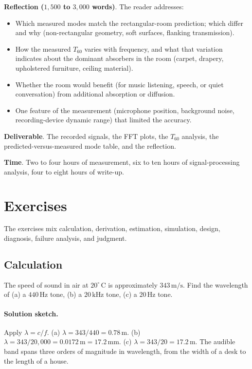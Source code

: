 \begin{project}
\textbf{Reflection ($1{,}500$ to $3{,}000$ words)}. The reader
addresses:

\begin{itemize}[leftmargin=*]
  \item Which measured modes match the rectangular-room prediction;
    which differ and why (non-rectangular geometry, soft surfaces,
    flanking transmission).
  \item How the measured $T_{60}$ varies with frequency, and what
    that variation indicates about the dominant absorbers in the
    room (carpet, drapery, upholstered furniture, ceiling material).
  \item Whether the room would benefit (for music listening,
    speech, or quiet conversation) from additional absorption or
    diffusion.
  \item One feature of the measurement (microphone position,
    background noise, recording-device dynamic range) that limited
    the accuracy.
\end{itemize}

\textbf{Deliverable}. The recorded signals, the FFT plots, the
$T_{60}$ analysis, the predicted-versus-measured mode table, and
the reflection.

\textbf{Time}. Two to four hours of measurement, six to ten hours of
signal-processing analysis, four to eight hours of write-up.
\end{project}

\section{Exercises}

The exercises mix calculation, derivation, estimation, simulation,
design, diagnosis, failure analysis, and judgment.

\subsection*{Calculation}

\begin{exercise}
The speed of sound in air at $20^{\circ}\,\mathrm{C}$ is approximately
$343\,\si{\meter\per\second}$. Find the wavelength of (a) a $440\,\si
{\hertz}$ tone, (b) a $20\,\si{\kilo\hertz}$ tone, (c) a $20\,\si{
\hertz}$ tone.
\paragraph{Solution sketch.} Apply $\lambda = c/f$.
(a) $\lambda = 343/440 = 0.78\,\si{\meter}$.
(b) $\lambda = 343/20{,}000 = 0.0172\,\si{\meter} = 17.2\,\si{
\milli\meter}$.
(c) $\lambda = 343/20 = 17.2\,\si{\meter}$. The audible band spans
three orders of magnitude in wavelength, from the width of a desk to
the length of a house.
\end{exercise}


